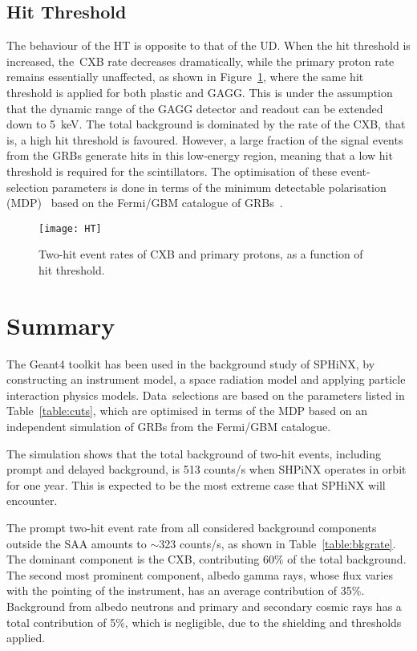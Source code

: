 \documentclass[galaxies,article,accept,moreauthors,pdftex,10pt,a4paper]{mdpi}
\begin{document}
\subsection{Hit Threshold}
The behaviour of the HT is opposite to that of the UD. When the hit threshold is increased, the~CXB rate decreases dramatically, while the primary proton rate remains essentially unaffected, as shown in Figure~\ref{fig:ht}, where the same hit threshold is applied for both plastic and GAGG. This is under the assumption that the dynamic range of the GAGG detector and readout can be extended down to 5~keV. The total background is dominated by the rate of the CXB, that is, a high hit threshold is favoured. However, a large fraction of the signal events from the GRBs generate hits in this low-energy region, meaning that a low hit threshold is required for the scintillators. The optimisation of these event-selection parameters is done in terms of the minimum detectable polarisation (MDP)~\cite{ref:mdp} based on the Fermi/GBM catalogue of GRBs\textcolor{black}{~\cite{ref:sphinx}}.
\vspace{-12pt}

\begin{figure}[H]
\centering
\texttt{[image: HT]}
\caption{Two-hit event rates of CXB and primary protons, as a function of hit threshold.}
\label{fig:ht}
\end{figure}


\section{Summary}
\label{sec:summary}
The Geant4 toolkit has been used in the background study of SPHiNX, by constructing an instrument model, a space radiation model and applying particle interaction physics models. Data~selections are based on the parameters listed in Table~\ref{table:cuts}, which are optimised in terms of the MDP based on an independent simulation of GRBs from the Fermi/GBM catalogue.

The simulation shows that the total background of two-hit events, including prompt and delayed background, is 513 counts/s when SHPiNX operates in orbit for one year. This is expected to be the most extreme case that SPHiNX will encounter.

The prompt two-hit event rate from all considered background components outside the SAA amounts to $\sim$323 counts/s, as shown in Table~\ref{table:bkgrate}. The dominant component is the CXB, contributing 60\% of the total background. The second most prominent component, albedo gamma rays, whose flux varies with the pointing of the instrument, has an average contribution of 35\%. Background from albedo neutrons and primary and secondary cosmic rays has a total contribution of 5\%, which is negligible, due to the shielding and thresholds applied.
\end{document}
